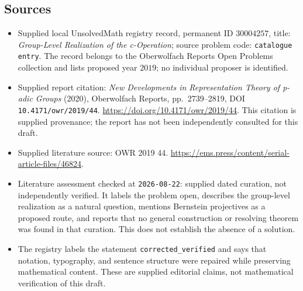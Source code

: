 \documentclass[11pt]{article}
\begin{document}
\subsection{Sources}
\begin{itemize}
\item Supplied local UnsolvedMath registry record, permanent ID \(30004257\), title: \emph{Group-Level Realization of the c-Operation}; source problem code: \texttt{catalogue entry}. The record belongs to the Oberwolfach Reports Open Problems collection and lists proposed year \(2019\); no individual proposer is identified.
\item Supplied report citation: \emph{New Developments in Representation Theory of p-adic Groups} (2020), Oberwolfach Reports, pp.\ 2739--2819, DOI \texttt{10.4171/owr/2019/44}. \url{https://doi.org/10.4171/owr/2019/44}. This citation is supplied provenance; the report has not been independently consulted for this draft.
\item Supplied literature source: OWR 2019 44. \url{https://ems.press/content/serial-article-files/46824}.
\item Literature assessment checked at \texttt{2026-08-22}: supplied dated curation, not independently verified. It labels the problem open, describes the group-level realization as a natural question, mentions Bernstein projectives as a proposed route, and reports that no general construction or resolving theorem was found in that curation. This does not establish the absence of a solution.
\item The registry labels the statement \texttt{corrected\_verified} and says that notation, typography, and sentence structure were repaired while preserving mathematical content. These are supplied editorial claims, not mathematical verification of this draft.
\end{itemize}
\end{document}
